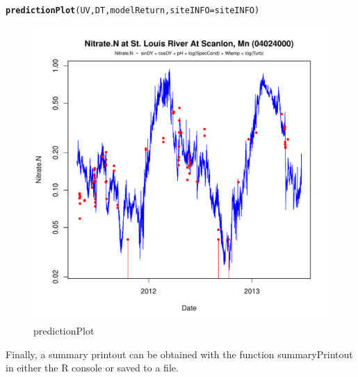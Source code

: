 \documentclass[a4paper,11pt]{article}\usepackage[]{graphicx}\usepackage[]{color}
\makeatletter
\def\maxwidth{ %
  \ifdim\Gin@nat@width>\linewidth
    \linewidth
  \else
    \Gin@nat@width
  \fi
}
\newcommand{\hlstd}[1]{\textcolor[rgb]{0.345,0.345,0.345}{#1}}%
\newcommand{\hlkwc}[1]{\textcolor[rgb]{0.333,0.667,0.333}{#1}}%
\newcommand{\hlkwd}[1]{\textcolor[rgb]{0.737,0.353,0.396}{\textbf{#1}}}%
\newenvironment{kframe}{%
 \def\at@end@of@kframe{}%
 \ifinner\ifhmode%
  \def\at@end@of@kframe{\end{minipage}}%
  \begin{minipage}{\columnwidth}%
 \fi\fi%
 \def\FrameCommand##1{\hskip\@totalleftmargin \hskip-\fboxsep
 \colorbox{shadecolor}{##1}\hskip-\fboxsep
     \hskip-\linewidth \hskip-\@totalleftmargin \hskip\columnwidth}%
 \MakeFramed {\advance\hsize-\width
   \@totalleftmargin\z@ \linewidth\hsize
   \@setminipage}}%
 {\par\unskip\endMakeFramed%
 \at@end@of@kframe}
\newenvironment{knitrout}{}{} %
\makeatother
\begin{document}
\begin{knitrout}
\color{fgcolor}\begin{kframe}
\begin{alltt}
\hlkwd{predictionPlot}\hlstd{(UV,DT,modelReturn,}\hlkwc{siteINFO}\hlstd{=siteINFO)}
\end{alltt}
\end{kframe}\begin{figure}[]

\includegraphics[width=\maxwidth]{figure/predictionPlot} \caption[predictionPlot]{predictionPlot\label{fig:predictionPlot}}
\end{figure}


\end{knitrout}

\FloatBarrier
Finally, a summary printout can be obtained with the function summaryPrintout in either the R console or saved to a file.
\end{document}
